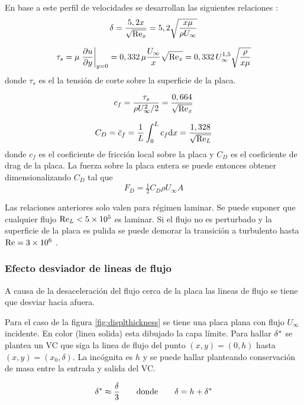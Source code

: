 En base a este perfil de velocidades se desarrollan las siguientes relaciones \citep{durst2008fluid}:
\begin{equation}
    \delta=\frac{5,2x}{\sqrt{\textrm{Re}_x}}=5,2\sqrt{\frac{x\mu}{\rho U_\infty}}
\end{equation}

\begin{equation}
    \tau_s=\mu \left. \frac{\partial u}{\partial y}\right|_{y=0}=0,332\,\mu\frac{U_\infty}{x}\sqrt{\textrm{Re}_x}=0,332\, U_\infty^{1,5}\sqrt{\frac{\rho}{x\mu}}
\end{equation}
donde $\tau_s$ es el la tensión de corte sobre la superficie de la placa. 

\begin{equation}
    c_f=\frac{\tau_s}{\rho U_\infty^2/2}=\frac{0,664}{\sqrt{\textrm{Re}_x}}
\end{equation}

\begin{equation}
    C_D=\bar{c}_f=\frac{1}{L}\int_0^Lc_f\textrm{d} x=\frac{1,328}{\sqrt{\textrm{Re}_L}}
\end{equation}
donde $c_f$ es el coeficiente de fricción local sobre la placa y $C_D$ es el coeficiente de drag de la placa. La fuerza sobre la placa entera se puede entonces obtener dimensionalizando $C_D$ tal que
\[
F_D=\tfrac{1}{2}C_D \rho U_\infty A
\]

Las relaciones anteriores solo valen para régimen laminar. Se puede suponer que cualquier flujo $\textrm{Re}_L<\num{5e5}$ es laminar. Si el flujo no es perturbado y la superficie de la placa es pulida se puede demorar la transición a turbulento hasta $\textrm{Re}=\num{3e6}$ \citep{kreith2011principles}.

\subsubsection*{Efecto desviador de lineas de flujo}
A causa de la desaceleración del flujo cerca de la placa las lineas de flujo se tiene que desviar hacia afuera. 

Para el caso de la figura \ref{fig:displthickness} se tiene una placa plana con flujo $U_\infty$ incidente. En color (linea solida) esta dibujado la capa límite. Para hallar $\delta^{*}$ se plantea un VC que siga la linea de flujo del punto $(x,y)=(0,h)$ hasta $(x,y)=(x_0,\delta)$. La incógnita es $h$ y se puede hallar planteando conservación de masa entre la entrada y salida del VC.

\begin{equation}
    \delta^{*} \approx \frac{\delta}{3}  \qquad \textrm{donde}\qquad  \delta=h+\delta^{*}
\end{equation}


